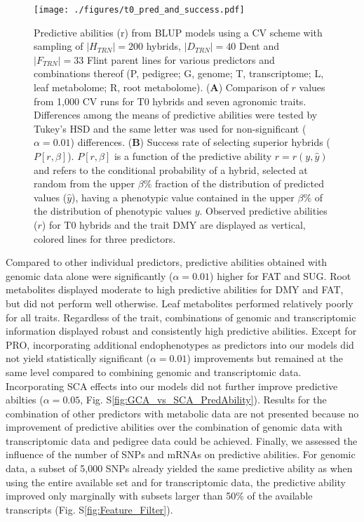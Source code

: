 \documentclass[12pt,titlepage]{article}
\begin{document}
\begin{figure*}[tbph]
\centering
\texttt{[image: ./figures/t0\_pred\_and\_success.pdf]}
  \caption{
  Predictive abilities (r) from BLUP models using a CV scheme with 
  sampling of $|H_{TRN}| = 200$ hybrids, $|D_{TRN}|=40$ Dent and $|F_{TRN}|=33$ 
  Flint parent lines for various predictors and combinations thereof 
  (P, pedigree; G, genome; T, transcriptome; L, leaf metabolome; R, root 
  metabolome).
  (\textbf{A}) Comparison of $r$ values from 1,000 CV runs for T0 hybrids and
  seven agronomic traits.
  Differences among the means of predictive abilities were tested by Tukey's HSD 
  and the same letter was used for non-significant ($\alpha = 0.01$) 
  differences.
  (\textbf{B}) Success rate of selecting superior hybrids ($P[r,\beta]$).
  $P[r, \beta]$ is a function of the predictive ability $r=r(y,\hat{y})$ and
  refers to the conditional probability of a hybrid, selected at random from the 
  upper $\beta \text{\%}$ fraction of the distribution of predicted values 
  ($\hat{y}$), having a phenotypic value contained in the upper $\beta \text{\%}$ 
  of the distribution of phenotypic values $y$.
  Observed predictive abilities ($r$) for T0 hybrids and the trait DMY are 
  displayed as vertical, colored lines for three predictors.
  }
\label{fig:PredAbility}
\end{figure*}

Compared to other individual predictors, predictive abilities obtained with
genomic data alone were significantly ($\alpha = 0.01$) higher for FAT and SUG.
Root metabolites displayed moderate to high predictive abilities for DMY and
FAT, but did not perform well otherwise.
Leaf metabolites performed relatively poorly for all traits.
Regardless of the trait, combinations of genomic and transcriptomic information 
displayed robust and consistently high predictive abilities.
Except for PRO, incorporating additional endophenotypes as predictors into our 
models did not yield statistically significant ($\alpha = 0.01$) improvements 
but remained at the same level compared to combining genomic and transcriptomic 
data.
Incorporating SCA effects into our models did not further improve predictive
abilties ($\alpha = 0.05$, Fig. S\ref{fig:GCA_vs_SCA_PredAbility}).
Results for the combination of other predictors with metabolic data are not
presented because no improvement of predictive abilities over the combination 
of genomic data with transcriptomic data and pedigree data could be achieved.
Finally, we assessed the influence of the number of SNPs and mRNAs on predictive 
abilities. 
For genomic data, a subset of 5,000 SNPs already yielded the same predictive 
ability as when using the entire available set and for transcriptomic data, the
predictive ability improved only marginally with subsets larger than 50\% of 
the available transcripts (Fig. S\ref{fig:Feature_Filter}).
\end{document}
